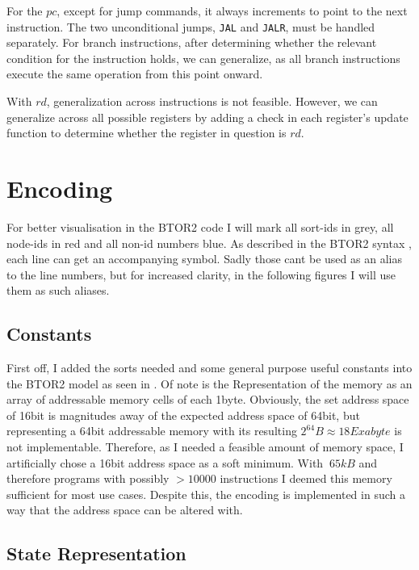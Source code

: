 For the $pc$, except for jump commands, it always increments to point to the
next instruction. The two unconditional jumps, \texttt{JAL} and \texttt{JALR},
must be handled separately. For branch instructions, after determining whether
the relevant condition for the instruction holds, we can generalize, as all
branch instructions execute the same operation from this point onward.

With $rd$, generalization across instructions is not feasible. However, we can
generalize across all possible registers by adding a check in each register's
update function to determine whether the register in question is $rd$.

\section{Encoding}
For better visualisation in the BTOR2 code I will mark all sort-ids in
\textcolor{UniGrey}{grey}, all node-ids in \textcolor{UniRed}{red} and all
non-id numbers \textcolor{UniBlue}{blue}.
As described in the BTOR2 syntax \cite[Figure 1]{btor2}, each line can get an accompanying symbol. Sadly those cant be used as an alias to the line numbers, but for increased clarity, in the following figures I will use them as such aliases.


\subsection{Constants}
First off, I added the sorts needed and some general purpose useful constants
into the BTOR2 model as seen in .
 Of note is the Representation of
the memory as an array of addressable memory cells of each 1byte. Obviously,
the set address space of 16bit is magnitudes away of the expected address space
of 64bit, but representing a 64bit addressable memory with its resulting
$2^{64}B \approx 18 Exabyte$ is not implementable. Therefore, as I needed a
feasible amount of memory space, I artificially chose a 16bit address space as
a soft minimum. With $~65kB$ and therefore programs with possibly $>10000$
instructions I deemed this memory sufficient for most use cases. Despite this,
the encoding is implemented in such a way that the address space can be altered
with. 

\subsection{State Representation}

